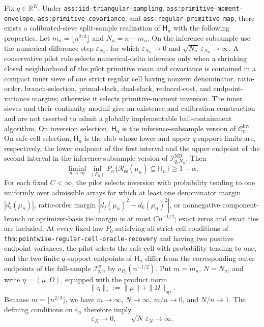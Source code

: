 Fix \(q\in\mathbb R^K\).  Under \texttt{ass:iid-triangular-sampling}, \texttt{ass:primitive-moment-envelope}, \texttt{ass:primitive-covariance}, and \texttt{ass:regular-primitive-map}, there exists a calibrated-sieve split-sample realization of \(\mathsf H_n\) with the following properties.  Let \(m_n=\lfloor n^{2/3}\rfloor\) and \(N_n=n-m_n\).  On the inference subsample use the numerical-difference step \(\varepsilon_{N_n}\), for which \(\varepsilon_{N_n}\to0\) and \(\sqrt{N_n}\,\varepsilon_{N_n}\to\infty\).  A conservative pilot rule selects numerical-delta inference only when a shrinking closed neighborhood of the pilot primitive mean and covariance is contained in a compact inner sieve of one strict regular cell having nonzero denominator, ratio-order, branch-selection, primal-slack, dual-slack, reduced-cost, and endpoint-variance margins; otherwise it selects primitive-moment inversion.  The inner sieves and their continuity moduli give an existence and calibration construction and are not asserted to admit a globally implementable ball-containment algorithm.  On inversion selection, \(\mathsf H_n\) is the inference-subsample version of \(\mathcal C_n^{\mathrm{inv}}\).  On safe-cell selection, \(\mathsf H_n\) is the slab whose lower and upper \(q\)-support limits are, respectively, the lower endpoint of the first interval and the upper endpoint of the second interval in the inference-subsample version of \(\mathcal I_{q,N_n}^{\mathrm{ND}}\).  Then
\[
 \liminf_{n\to\infty}\inf_{(P_n)}P_n\{\mathcal R_{\mathrm{ss}}(\mu_n)\subseteq\mathsf H_n\}\ge1-\alpha.
\]
For each fixed \(C<\infty\), the pilot selects inversion with probability tending to one uniformly over admissible arrays for which at least one denominator margin \(|d_i(\mu_n)|\), ratio-order margin \(|d_j(\mu_n)^2-d_k(\mu_n)^2|\), or nonnegative component-branch or optimizer-basis tie margin is at most \(Cn^{-1/2}\); exact zeros and exact ties are included.  At every fixed law \(P_0\) satisfying all strict-cell conditions of \texttt{thm:pointwise-regular-cell-oracle-recovery} and having two positive endpoint variances, the pilot selects the safe cell with probability tending to one, and the two finite \(q\)-support endpoints of \(\mathsf H_n\) differ from the corresponding outer endpoints of the full-sample \(\mathcal I_{q,n}^{\mathrm{or}}\) by \(o_{P_0}(n^{-1/2})\).
Put \(m=m_n\), \(N=N_n\), and write \(\eta=(\mu,\Omega)\), equipped with the product norm
\[
 \|\eta\|_*:=\|\mu\|+\|\Omega\|_{\mathrm{op}}.
\]
Because \(m=\lfloor n^{2/3}\rfloor\), we have \(m\to\infty\), \(N\to\infty\), \(m/n\to0\), and \(N/n\to1\).  The defining conditions on \(\varepsilon_n\) therefore imply
\[
 \varepsilon_N\to0,
 \qquad
 \sqrt N\,\varepsilon_N\to\infty. \tag{1}
\]

